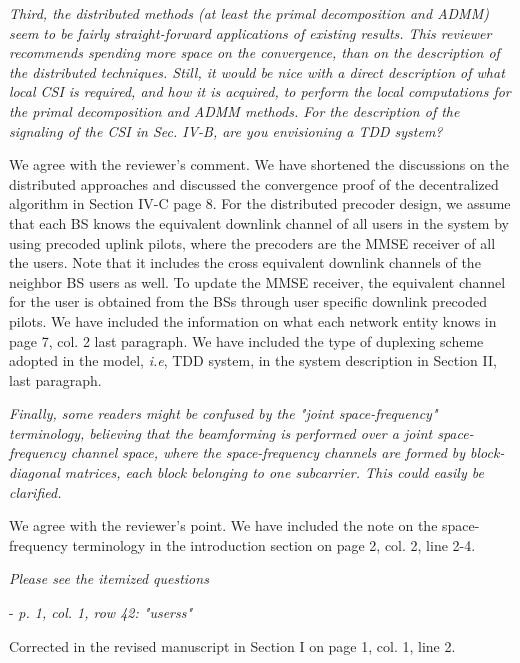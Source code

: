 \begin{itemize}
 \textit{Third, the distributed methods (at least the primal decomposition and ADMM) seem to be fairly straight-forward applications of existing results. This reviewer recommends spending more space on the convergence, than on the description of the distributed techniques. Still, it would be nice with a direct description of what local CSI is required, and how it is acquired, to perform the local computations for the primal decomposition and ADMM methods. For the description of the signaling of the CSI in Sec. IV-B, are you envisioning a TDD system?}

\resp We agree with the reviewer's comment. We have shortened the discussions on the distributed approaches and discussed the convergence proof of the decentralized algorithm in Section IV-C page 8. For the distributed precoder design, we assume that each \ac{BS}  knows the equivalent downlink channel  of all users in the system by using precoded uplink pilots, where the precoders are the MMSE receiver of all the users. Note that it includes the cross equivalent downlink channels of the neighbor BS users as well. To update the MMSE receiver, the equivalent channel for the  user  is obtained from the BSs through user specific downlink precoded pilots. We have included the information on what each network entity knows in page 7, col. 2 last paragraph. We have included the type of duplexing scheme adopted in the model, \textit{i.e}, TDD system, in the system description in Section II, last paragraph.

 \textit{Finally, some readers might be confused by the "joint space-frequency" terminology, believing that the beamforming is performed over a joint space-frequency channel space, where the space-frequency channels are formed by block-diagonal matrices, each block belonging to one subcarrier. This could easily be clarified.} 

\resp We agree with the reviewer's point. We have included the note on the space-frequency terminology in the introduction section on page 2, col. 2, line 2-4.

 \textit{Please see the itemized questions}

\begin{itemize}

 - \textit{p. 1, col. 1, row 42: "userss"}

\resp Corrected in the revised manuscript in Section I on page 1, col. 1, line 2.


\end{itemize}
\end{itemize}
